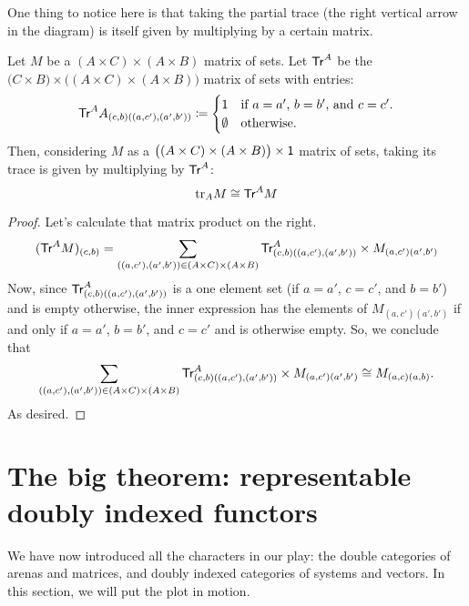 \documentclass[DynamicalBook]{subfiles}
\begin{document}
One thing to notice here is that taking the partial trace (the right vertical
arrow in the diagram) is itself given by multiplying by a certain matrix.
\begin{proposition}\label{prop.trace_multiplying_by_matrix}
  Let $M$ be a $(A \times C) \times (A \times B)$ matrix of sets. Let
  $\mathsf{Tr}^A$ be the $\big(C \times B \big) \times \big((A \times C) \times (A
  \times B)\big)$ matrix of sets with entries:
  \[
    \mathsf{Tr}^A{A}_{(c, b)((a,c'),(a', b'))} \coloneqq \begin{cases} 
      \mathsf{1} &\mbox{if $a = a'$, $b = b'$, and $c = c'$.} \\
      \emptyset &\mbox{otherwise.}
    \end{cases} 
\]
  Then, considering $M$ as a $\big((A \times C) \times (A \times B)\big) \times
  \mathsf{1}$ matrix of sets, taking its trace is given by multiplying by $\mathsf{Tr}^A$:
$$\mathrm{tr}_{A}M \cong \mathsf{Tr}^A M$$
\end{proposition}
\begin{proof}
  Let's calculate that matrix product on the right.
  \begin{align*}
    (\mathsf{Tr}^A M)_{(c, b)} &= \sum_{((a, c'), (a', b')) \in (A \times C) \times (A \times B)} \mathsf{Tr}^A_{(c,b)((a, c'),(a', b'))} \times M_{(a,c')(a',b')} \\
  \end{align*}
  Now, since $\mathsf{Tr}^A_{(c,b)((a,c'),(a',b'))}$ is a one element set (if $a =
  a'$, $c = c'$, and $b = b'$) and is empty otherwise, the inner expression has
  the elements of $M_{(a,c')(a', b')}$ if and only if $a = a'$, $b = b'$, and $c
  = c'$ and is otherwise empty. So, we conclude that
  \[
\sum_{((a, c'), (a', b')) \in (A \times C) \times (A \times B)}
\mathsf{Tr}^A_{(c,b)((a, c'),(a', b'))} \times M_{(a,c')(a',b')} \cong M_{(a, c)(a,
  b)}.
\]
As desired.
\end{proof}







\section{The big theorem: representable doubly indexed functors}

We have now introduced all the characters in our play: the double categories of
arenas and matrices, and doubly indexed categories of systems and vectors. In
this section, we will put the plot in motion. 
\end{document}
